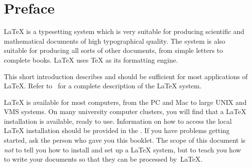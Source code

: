 \chapter{Preface}

\LaTeX{} \cite{manual} is a typesetting system which is very 
suitable for producing scientific and mathematical documents of high
typographical quality. The system is also suitable for producing all
sorts of other documents, from simple letters to complete books.
\LaTeX{} uses \TeX{} \cite{texbook} as its formatting engine.

This short introduction describes \LaTeXe{} and should be sufficient
for most applications of \LaTeX. Refer to~\cite{manual,companion} for
a complete description of the \LaTeX{} system.

\LaTeX{} is available for most computers, from the PC and Mac to large
UNIX and VMS systems. On many university computer clusters, you will
find that a \LaTeX{} installation is available, ready to use.
Information on how to access
the local \LaTeX{} installation should be provided in the \guide. If
you have problems getting started, ask the person who gave you this
booklet. The scope of this document is \emph{not} to tell you how to
install and set up a \LaTeX{} system, but to teach you how to write
your documents so that they can be processed by~\LaTeX{}.

